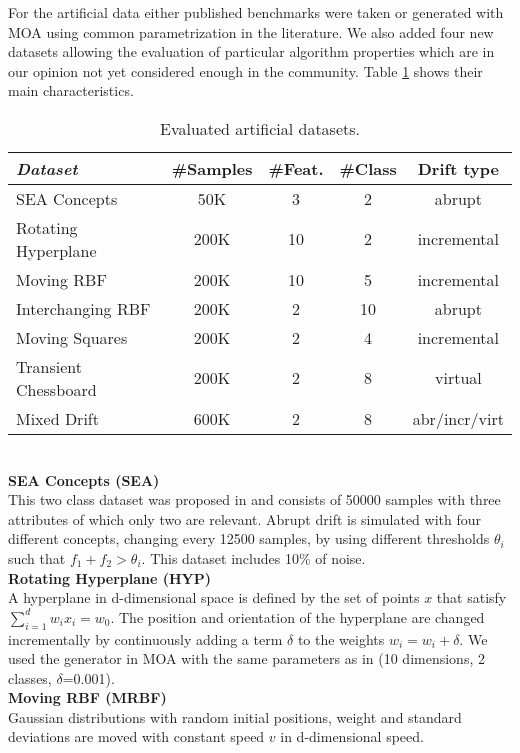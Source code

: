 \documentclass[conference]{IEEEtran}
\begin{document}
For the artificial data either published benchmarks were taken or generated with MOA using common parametrization in the literature.
We also added four new datasets allowing the evaluation of particular algorithm properties which are in our opinion not yet considered enough in the community. 
Table \ref{tab:artDatasets} shows their main characteristics.
\begin{table}
\def\arraystretch{0.9}
\footnotesize
\centering
\caption{Evaluated artificial datasets.}
\label{tab:datasets}
\begin{tabular}{l|cccc}
\textit{Dataset} & \#Samples&\#Feat.&\#Class&Drift type\\\hline
SEA Concepts & 50K & 3 & 2 & abrupt\\
Rotating Hyperplane & 200K & 10 & 2 & incremental\\
Moving RBF & 200K & 10 & 5 & incremental\\
Interchanging RBF & 200K & 2 & 10 & abrupt\\
Moving Squares & 200K & 2 & 4 & incremental\\
Transient Chessboard & 200K & 2 & 8 & virtual\\
Mixed Drift & 600K & 2 & 8 & abr/incr/virt\\
\end{tabular}
\label{tab:artDatasets}
\end{table}
\\\textbf{SEA Concepts (SEA)}\\
This two class dataset was proposed in \cite{Street:2001:SEA:502512.502568} and consists of 50000 samples with three attributes of which only two are relevant.
Abrupt drift is simulated with four different concepts, changing every 12500 samples, by using different thresholds $\theta_i$ such that $f_1 + f_2 > \theta_i$.
This dataset includes 10\% of noise.\\
\textbf{Rotating Hyperplane (HYP)}\\
A hyperplane in d-dimensional space is defined by the set of points $x$ that satisfy $\sum_{i=1}^{d}w_ix_i=w_0$. The position and orientation of the hyperplane
are changed incrementally by continuously adding a term $\delta$ to the weights $w_i=w_i+\delta$. 
We used the generator in MOA with the same parameters as in \cite{Bifet:2013:EDS:2480362.2480516} (10 dimensions, 2 classes, $\delta$=0.001).\\ 
\textbf{Moving RBF (MRBF)}\\
Gaussian distributions with random initial positions, weight and standard deviations are moved with constant speed $v$ in d-dimensional speed. 
\end{document}
